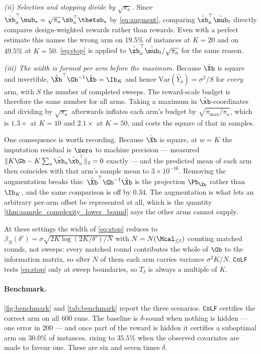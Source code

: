 \emph{(ii) Selection and stopping divide by $\sqrt{\pi_a}$.}  Since
$\hat\xb_a^\top\mub_\star=\sqrt{\pi_a}\,\zb_a^\top\thetab_\star$ by
\cref{eq:augment}, comparing $\hat\xb_a^\top\hat\mub_t$ directly compares
design-weighted rewards rather than rewards.  Even with a perfect estimate this
names the wrong arm on $19.5\%$ of instances at $K=20$ and on $49.5\%$ at
$K=50$.  \cref{eq:stop} is applied to $\hat\xb_a^\top\hat\mub_t/\sqrt{\pi_a}$
for the same reason.

\emph{(iii) The width is formed per arm before the maximum.}  Because $\hat\Xb$
is square and invertible, $\hat\Xb^\top\Gb^{-1}\hat\Xb=\Ib_K$ and hence
$\mathrm{Var}(\hat Y_a)=\sigma^2/S$ for \emph{every} arm, with $S$ the number
of completed sweeps.  The reward-scale budget is therefore the same number for
all arms.  Taking a maximum in $\hat\xb$-coordinates and dividing by
$\sqrt{\pi_a}$ afterwards inflates each arm's budget by
$\sqrt{\pi_{\max}/\pi_a}$, which is $1.3\times$ at $K=10$ and $2.1\times$ at
$K=50$, and costs the square of that in samples.

One consequence is worth recording.  Because $\hat\Xb$ is square, at $w=K$ the
imputation residual is $\zero$ to machine precision --- measured
$\|K\Gb-K\sum_a\hat\xb_a\hat\xb_a^\top\|_2=0$ exactly --- and the predicted
mean of each arm then coincides with that arm's sample mean to
$3\times10^{-16}$.  Removing the augmentation breaks this:
$\hat\Xb^\top\Gb^{-1}\hat\Xb$ is the projection $\Pb_{\bar\Xb}$ rather than
$\Ib_K$, and the same comparison is off by $0.34$.  The augmentation is what
lets an arbitrary per-arm offset be represented at all, which is the quantity
\cref{thm:sample_complexity_lower_bound} says the other arms cannot supply.

At these settings the width of \cref{eq:stop} reduces to
$\beta_{N}(\delta')=\sigma\sqrt{2K\log(2K/\delta')/N}$ with $N=N(\Mcal_{\le t})$
counting matched rounds, not sweeps: every matched round contributes the whole
of $\Gb$ to the information matrix, so after $N$ of them each arm carries
variance $\sigma^2K/N$.  \texttt{CoLF} tests \cref{eq:stop} only at sweep
boundaries, so $T_\delta$ is always a multiple of $K$.

\paragraph{Benchmark.}
\cref{fig:benchmark} and \cref{tab:benchmark} report the three scenarios.
\texttt{CoLF} certifies the correct arm on all $600$ runs.  The baseline is
$\delta$-sound when nothing is hidden --- one error in $200$ --- and once part
of the reward is hidden it certifies a suboptimal arm on $30.0\%$ of instances,
rising to $35.5\%$ when the observed covariates are made to favour one.  These
are six and seven times $\delta$.

